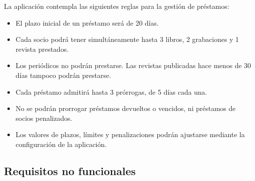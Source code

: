 La aplicación contempla las siguientes reglas para la gestión de préstamos:

\begin{itemize}
	\item El plazo inicial de un préstamo será de 20 días.
	\item Cada socio podrá tener simultáneamente hasta 3 libros, 2 grabaciones y 1 revista prestados.
	\item Los periódicos no podrán prestarse. Las revistas publicadas hace menos de 30 días tampoco podrán prestarse.
	\item Cada préstamo admitirá hasta 3 prórrogas, de 5 días cada una.
	\item No se podrán prorrogar préstamos devueltos o vencidos, ni préstamos de socios penalizados.
	\item Los valores de plazos, límites y penalizaciones podrán ajustarse mediante la configuración de la aplicación.
\end{itemize}

\subsection{Requisitos no funcionales}

